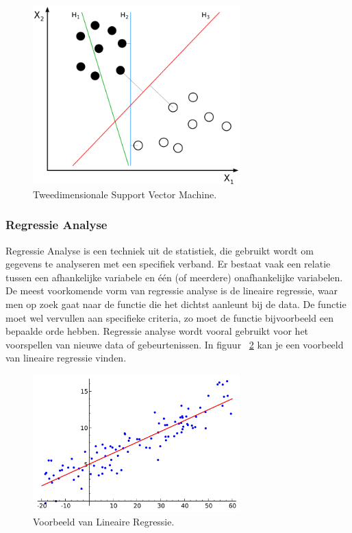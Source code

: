 	
	\begin{figure}
		\centering
		\includegraphics[width=80mm]{afbeeldingen/supportVectorMachines.PNG}
		\caption[Tweedimensionale Support Vector Machine.]{Tweedimensionale Support Vector Machine\cite{bron:supportvectormachines}.}
		\label{fig:supportVectorMachines}
	\end{figure}
		
			
	\subsubsection{Regressie Analyse}
	Regressie Analyse is een techniek uit de statistiek\cite{sieben2009logistische}, die gebruikt wordt om gegevens te analyseren met een specifiek verband. Er bestaat vaak een relatie tussen een afhankelijke variabele en \'e\'en (of meerdere) onafhankelijke variabelen. De meest voorkomende vorm van regressie analyse is de lineaire regressie, waar men op zoek gaat naar de functie die het dichtst aanleunt bij de data. De functie moet wel vervullen aan specifieke criteria, zo moet de functie bijvoorbeeld een bepaalde orde hebben. Regressie analyse wordt vooral gebruikt voor het voorspellen van nieuwe data of gebeurtenissen. In figuur ~\ref{fig:regressieAnalyse} kan je een voorbeeld van lineaire regressie vinden.

	\begin{figure}
		\centering
		\includegraphics[width=80mm]{afbeeldingen/regressieAnalyse.PNG}
		\caption[Voorbeeld van Lineaire Regressie.]{Voorbeeld van Lineaire Regressie\cite{bron:regressieanalyse}.}
		\label{fig:regressieAnalyse}
		
	\end{figure}
	
